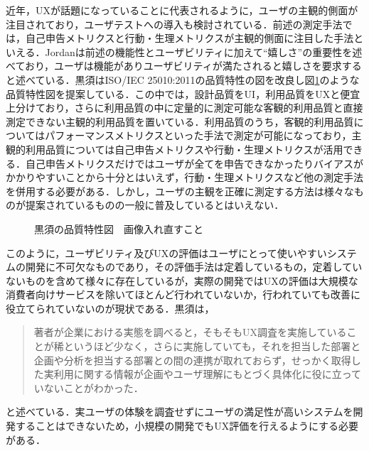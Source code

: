 近年，UXが話題になっていることに代表されるように，ユーザの主観的側面が注目されており，ユーザテストへの導入も検討されている．前述の測定手法では，自己申告メトリクスと行動・生理メトリクスが主観的側面に注目した手法といえる．Jordanは前述の機能性とユーザビリティに加えて``嬉しさ''の重要性を述べており，ユーザは機能がありユーザビリティが満たされると嬉しさを要求すると述べている\cite{jordan2000designing}．黒須はISO/IEC 25010:2011の品質特性の図を改良し図\ref{fig:kurosu2015}のような品質特性図を提案している\cite{kurosu2015}．この中では，設計品質をUI，利用品質をUXと便宜上分けており，さらに利用品質の中に定量的に測定可能な客観的利用品質と直接測定できない主観的利用品質を置いている．利用品質のうち，客観的利用品質についてはパフォーマンスメトリクスといった手法で測定が可能になっており，主観的利用品質については自己申告メトリクスや行動・生理メトリクスが活用できる．自己申告メトリクスだけではユーザが全てを申告できなかったりバイアスがかかりやすいことから十分とはいえず，行動・生理メトリクスなど他の測定手法を併用する必要がある．しかし，ユーザの主観を正確に測定する方法は様々なものが提案されているものの一般に普及しているとはいえない．

\begin{figure}[htbp]
  \begin{minipage}{\hsize}
    \begin{center}
    \end{center}
    \caption{黒須の品質特性図　画像入れ直すこと}
    \label{fig:kurosu2015}
  \end{minipage}
\end{figure}

このように，ユーザビリティ及びUXの評価はユーザにとって使いやすいシステムの開発に不可欠なものであり，その評価手法は定着しているもの，定着していないものを含めて様々に存在しているが，実際の開発ではUXの評価は大規模な消費者向けサービスを除いてほとんど行われていないか，行われていても改善に役立てられていないのが現状である．黒須\cite{kurosu}は，\begin{quotation}
  著者が企業における実態を調べると，そもそもUX調査を実施していることが稀というほど少なく，さらに実施していても，それを担当した部署と企画や分析を担当する部署との間の連携が取れておらず，せっかく取得した実利用に関する情報が企画やユーザ理解にもとづく具体化に役に立っていないことがわかった．
\end{quotation}と述べている．実ユーザの体験を調査せずにユーザの満足性が高いシステムを開発することはできないため，小規模の開発でもUX評価を行えるようにする必要がある．

